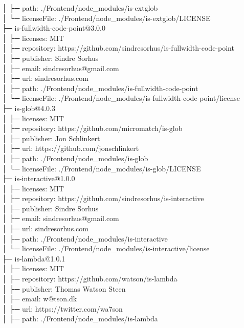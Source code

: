 │  ├─ path: ./Frontend/node\_modules/is-extglob\\
│  └─ licenseFile: ./Frontend/node\_modules/is-extglob/LICENSE\\
├─ is-fullwidth-code-point@3.0.0\\
│  ├─ licenses: MIT\\
│  ├─ repository: https://github.com/sindresorhus/is-fullwidth-code-point\\
│  ├─ publisher: Sindre Sorhus\\
│  ├─ email: sindresorhus@gmail.com\\
│  ├─ url: sindresorhus.com\\
│  ├─ path: ./Frontend/node\_modules/is-fullwidth-code-point\\
│  └─ licenseFile: ./Frontend/node\_modules/is-fullwidth-code-point/license\\
├─ is-glob@4.0.3\\
│  ├─ licenses: MIT\\
│  ├─ repository: https://github.com/micromatch/is-glob\\
│  ├─ publisher: Jon Schlinkert\\
│  ├─ url: https://github.com/jonschlinkert\\
│  ├─ path: ./Frontend/node\_modules/is-glob\\
│  └─ licenseFile: ./Frontend/node\_modules/is-glob/LICENSE\\
├─ is-interactive@1.0.0\\
│  ├─ licenses: MIT\\
│  ├─ repository: https://github.com/sindresorhus/is-interactive\\
│  ├─ publisher: Sindre Sorhus\\
│  ├─ email: sindresorhus@gmail.com\\
│  ├─ url: sindresorhus.com\\
│  ├─ path: ./Frontend/node\_modules/is-interactive\\
│  └─ licenseFile: ./Frontend/node\_modules/is-interactive/license\\
├─ is-lambda@1.0.1\\
│  ├─ licenses: MIT\\
│  ├─ repository: https://github.com/watson/is-lambda\\
│  ├─ publisher: Thomas Watson Steen\\
│  ├─ email: w@tson.dk\\
│  ├─ url: https://twitter.com/wa7son\\
│  ├─ path: ./Frontend/node\_modules/is-lambda\\
